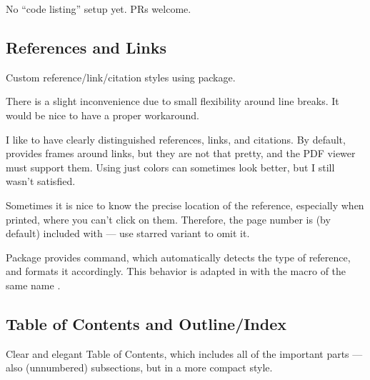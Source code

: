 \begin{Note}
    No \enquote{code listing} setup yet.
    PRs welcome.
\end{Note}

\subsection{References and Links}%
\label{sub:References Links}

Custom reference/link/citation styles using  package.
\begin{Note}
    There is a slight inconvenience due to small flexibility around line breaks.
    It would be nice to have a proper workaround.
\end{Note}
\begin{remark}[Rationale]
    I like to have clearly distinguished references, links, and citations.
    By default,  provides frames around links, but they are not that pretty, and the PDF viewer must support them.
    Using just colors can sometimes look better, but I still wasn't satisfied.

    Sometimes it is nice to know the precise location of the reference, especially when printed, where you can't click on them.
    Therefore, the page number is (by default) included with \custommacro{\Cref} --- use starred variant \custommacro{\Cref*} to omit it.
\end{remark}
\begin{remark}
    Package  provides \macro{\Cref} command, which automatically detects the type of reference, and formats it accordingly.
    This behavior is adapted in \TeXtured{} with the macro of the same name \custommacro{\Cref}.
\end{remark}

\subsection{Table of Contents and Outline/Index}%
\label{sub:Table of Contents and Index}

Clear and elegant Table of Contents, which includes all of the important parts --- also (unnumbered) subsections, but in a more compact style.

